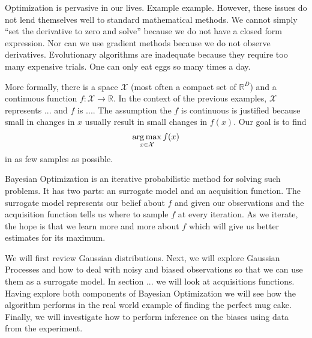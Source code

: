 Optimization is pervasive in our lives.
Example example.
However, these issues do not lend themselves well to standard mathematical methods.
We cannot simply ``set the derivative to zero and solve'' because we do not have a closed form expression.
Nor can we use gradient methods because we do not observe derivatives.
Evolutionary algorithms are inadequate because they require too many expensive trials.
One can only eat eggs so many times a day.

More formally, there is a space $\mathcal{X}$ (most often a compact set of $\mathbb{R}^{D}$) and a continuous function $f: \mathcal{X} \to \mathbb{R}$.
In the context of the previous examples, $\mathcal{X}$ represents ... and $f$ is ....
The assumption the $f$ is continuous is justified because small in changes in $x$ usually result in small changes in $f(x)$.
Our goal is to find
\begin{equation*}
    \operatorname*{arg\,max}_{x \in \mathcal{X}} f(x)
\end{equation*}
in as few samples as possible.

Bayesian Optimization is an iterative probabilistic method for solving such problems.
It has two parts: an surrogate model and an acquisition function.
The surrogate model represents our belief about $f$ and given our observations
and the acquisition function tells us where to sample $f$ at every iteration.
As we iterate, the hope is that we learn more and more about $f$ which will give us better estimates for its maximum.

We will first review Gaussian distributions.
Next, we will explore Gaussian Processes and how to deal with noisy and biased observations
so that we can use them as a surrogate model.
In section ... we will look at acquisitions functions.
Having explore both components of Bayesian Optimization we will see how the algorithm performs in the real world example of finding the perfect mug cake.
Finally, we will investigate how to perform inference on the biases using data from the experiment.

